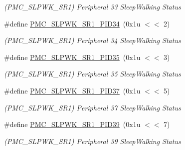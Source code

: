 \begin{DoxyCompactItemize}
\begin{DoxyCompactList}\small\item\em (P\+M\+C\+\_\+\+S\+L\+P\+W\+K\+\_\+\+S\+R1) Peripheral 33 Sleep\+Walking Status \end{DoxyCompactList}\item 
\mbox{\label{group__SAME70__PMC_ga8822fe4c11dc208c63594d9b5c6613df}} 
\#define \mbox{\hyperlink{group__SAME70__PMC_ga8822fe4c11dc208c63594d9b5c6613df}{P\+M\+C\+\_\+\+S\+L\+P\+W\+K\+\_\+\+S\+R1\+\_\+\+P\+I\+D34}}~(0x1u $<$$<$ 2)
\begin{DoxyCompactList}\small\item\em (P\+M\+C\+\_\+\+S\+L\+P\+W\+K\+\_\+\+S\+R1) Peripheral 34 Sleep\+Walking Status \end{DoxyCompactList}\item 
\mbox{\label{group__SAME70__PMC_ga7f6b767906dbe36607ff26bf0b021b3a}} 
\#define \mbox{\hyperlink{group__SAME70__PMC_ga7f6b767906dbe36607ff26bf0b021b3a}{P\+M\+C\+\_\+\+S\+L\+P\+W\+K\+\_\+\+S\+R1\+\_\+\+P\+I\+D35}}~(0x1u $<$$<$ 3)
\begin{DoxyCompactList}\small\item\em (P\+M\+C\+\_\+\+S\+L\+P\+W\+K\+\_\+\+S\+R1) Peripheral 35 Sleep\+Walking Status \end{DoxyCompactList}\item 
\mbox{\label{group__SAME70__PMC_gac4237fa239f3feb2e392c03e6dc5ee25}} 
\#define \mbox{\hyperlink{group__SAME70__PMC_gac4237fa239f3feb2e392c03e6dc5ee25}{P\+M\+C\+\_\+\+S\+L\+P\+W\+K\+\_\+\+S\+R1\+\_\+\+P\+I\+D37}}~(0x1u $<$$<$ 5)
\begin{DoxyCompactList}\small\item\em (P\+M\+C\+\_\+\+S\+L\+P\+W\+K\+\_\+\+S\+R1) Peripheral 37 Sleep\+Walking Status \end{DoxyCompactList}\item 
\mbox{\label{group__SAME70__PMC_ga21c2dae73b4a4c28ecf39daa50391f67}} 
\#define \mbox{\hyperlink{group__SAME70__PMC_ga21c2dae73b4a4c28ecf39daa50391f67}{P\+M\+C\+\_\+\+S\+L\+P\+W\+K\+\_\+\+S\+R1\+\_\+\+P\+I\+D39}}~(0x1u $<$$<$ 7)
\begin{DoxyCompactList}\small\item\em (P\+M\+C\+\_\+\+S\+L\+P\+W\+K\+\_\+\+S\+R1) Peripheral 39 Sleep\+Walking Status \end{DoxyCompactList}\item 

\end{DoxyCompactItemize}
